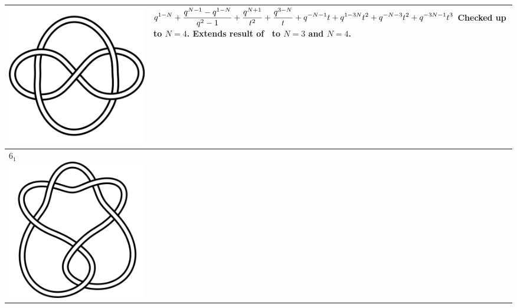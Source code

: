 \documentclass{compositio}
\theoremstyle{definition}
\numberwithin{equation}{section}
\begin{document}
{\begin{longtable}{p{}|p{}}
\includegraphics[scale=0.07,angle=0]{link5_1_2.pdf} 
& 
$
\displaystyle{%
q^{1-N}+\frac{q^{N-1} - q^{1-N}}{q^2-1}+\frac{q^{N+1}}{t^2}+\frac{q^{3-N}}{t}+q^{-N-1} t+q^{1-3N} t^2+q^{-N-3} t^2+q^{-3 N-1} t^3
}
$
\newline\newline\newline\newline
Checked up to $N=4$. Extends result of~\cite{r0508510} to $N=3$ and $N=4$. 
\\
\hline
$6_{1}$ 
\includegraphics[scale=0.07,angle=0]{knot6_1.pdf} 

\end{longtable}}
\end{document}
